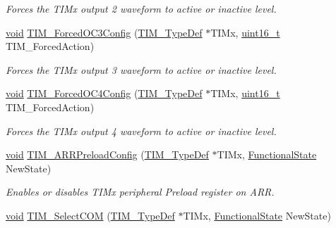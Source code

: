 \begin{DoxyCompactItemize}
\begin{DoxyCompactList}\small\item\em Forces the T\+I\+Mx output 2 waveform to active or inactive level. \end{DoxyCompactList}\item 
\hyperlink{usb__devapi_8h_afabf60e7f57651d6d595a02c75f07cd0}{void} \hyperlink{group___t_i_m___exported___functions_ga920b0fb4ca44fceffd1c3e441feebd8f}{T\+I\+M\+\_\+\+Forced\+O\+C3\+Config} (\hyperlink{struct_t_i_m___type_def}{T\+I\+M\+\_\+\+Type\+Def} $\ast$T\+I\+Mx, \hyperlink{_p_e___types_8h_a1f1825b69244eb3ad2c7165ddc99c956}{uint16\+\_\+t} T\+I\+M\+\_\+\+Forced\+Action)
\begin{DoxyCompactList}\small\item\em Forces the T\+I\+Mx output 3 waveform to active or inactive level. \end{DoxyCompactList}\item 
\hyperlink{usb__devapi_8h_afabf60e7f57651d6d595a02c75f07cd0}{void} \hyperlink{group___t_i_m___exported___functions_gaf0a0bbe74251e56d4b835d20b0a3aa63}{T\+I\+M\+\_\+\+Forced\+O\+C4\+Config} (\hyperlink{struct_t_i_m___type_def}{T\+I\+M\+\_\+\+Type\+Def} $\ast$T\+I\+Mx, \hyperlink{_p_e___types_8h_a1f1825b69244eb3ad2c7165ddc99c956}{uint16\+\_\+t} T\+I\+M\+\_\+\+Forced\+Action)
\begin{DoxyCompactList}\small\item\em Forces the T\+I\+Mx output 4 waveform to active or inactive level. \end{DoxyCompactList}\item 
\hyperlink{usb__devapi_8h_afabf60e7f57651d6d595a02c75f07cd0}{void} \hyperlink{group___t_i_m___exported___functions_ga42b44b9fc2b0798d733720dd6bac1ac0}{T\+I\+M\+\_\+\+A\+R\+R\+Preload\+Config} (\hyperlink{struct_t_i_m___type_def}{T\+I\+M\+\_\+\+Type\+Def} $\ast$T\+I\+Mx, \hyperlink{agilefox_2library_2inc_2stm32f10x__type_8h_ac9a7e9a35d2513ec15c3b537aaa4fba1}{Functional\+State} New\+State)
\begin{DoxyCompactList}\small\item\em Enables or disables T\+I\+Mx peripheral Preload register on A\+RR. \end{DoxyCompactList}\item 
\hyperlink{usb__devapi_8h_afabf60e7f57651d6d595a02c75f07cd0}{void} \hyperlink{group___t_i_m___exported___functions_gaff2e7f9959b1b36e830df028c14accc8}{T\+I\+M\+\_\+\+Select\+C\+OM} (\hyperlink{struct_t_i_m___type_def}{T\+I\+M\+\_\+\+Type\+Def} $\ast$T\+I\+Mx, \hyperlink{agilefox_2library_2inc_2stm32f10x__type_8h_ac9a7e9a35d2513ec15c3b537aaa4fba1}{Functional\+State} New\+State)

\end{DoxyCompactItemize}
